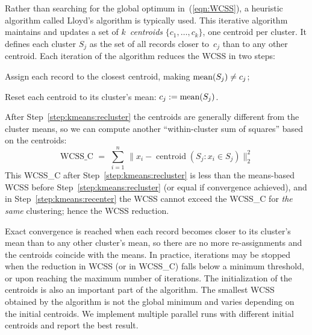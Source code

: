 Rather than searching for the global optimum in~(\ref{eqn:WCSS}), a heuristic algorithm
called Lloyd's algorithm is typically used.  This iterative algorithm maintains
and updates a set of $k$~\emph{centroids} $\{c_1, \ldots, c_k\}$, one centroid per cluster.
It defines each cluster $S_j$ as the set of all records closer to~$c_j$ than
to any other centroid.  Each iteration of the algorithm reduces the WCSS in two steps:
\begin{Enumerate}
\item Assign each record to the closest centroid, making $\mathop{\mathrm{mean}}\nolimits(S_j)\neq c_j$;
\label{step:kmeans:recluster}
\item Reset each centroid to its cluster's mean: $c_j := \mathop{\mathrm{mean}}\nolimits(S_j)$.
\label{step:kmeans:recenter}
\end{Enumerate}
After Step~\ref{step:kmeans:recluster} the centroids are generally different from the cluster
means, so we can compute another ``within-cluster sum of squares'' based on the centroids:
\begin{equation}
\textrm{WCSS\_C}\,\,=\,\, \sum_{i=1}^n \,\big\|x_i - \mathop{\textrm{centroid}}(S_j: x_i\in S_j)\big\|_2^2
\label{eqn:WCSS:C}
\end{equation}
This WCSS\_C after Step~\ref{step:kmeans:recluster} is less than the means-based WCSS
before Step~\ref{step:kmeans:recluster} (or equal if convergence achieved), and in
Step~\ref{step:kmeans:recenter} the WCSS cannot exceed the WCSS\_C for \emph{the same}
clustering; hence the WCSS reduction.

Exact convergence is reached when each record becomes closer to its
cluster's mean than to any other cluster's mean, so there are no more re-assignments
and the centroids coincide with the means.  In practice, iterations may be stopped
when the reduction in WCSS (or in WCSS\_C) falls below a minimum threshold, or upon
reaching the maximum number of iterations.  The initialization of the centroids is also
an important part of the algorithm.  The smallest WCSS obtained by the algorithm is not
the global minimum and varies depending on the initial centroids.  We implement multiple
parallel runs with different initial centroids and report the best result.

